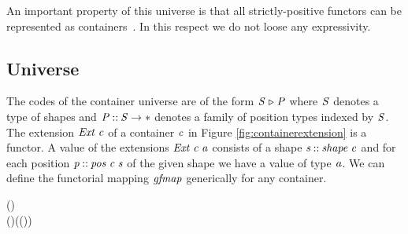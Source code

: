 An important property of this universe is that all strictly-positive
functors can be represented as containers~\cite{containers}. In this
respect we do not loose any expressivity.

\subsection{Universe}

The codes of the container universe are of the form \ensuremath{\Conid{S}{\;\triangleright\;}\Conid{P}} where
\ensuremath{\Conid{S}} denotes a type of shapes and \ensuremath{\Conid{P}\mathbin{::}\Conid{S}\to \mathbin{*}} denotes a family of
position types indexed by \ensuremath{\Conid{S}}. The extension \ensuremath{\Conid{Ext}\;\Varid{c}} of a container
\ensuremath{\Varid{c}} in Figure \ref{fig:containerextension} is a functor. A value of
the extensions \ensuremath{\Conid{Ext}\;\Varid{c}\;\Varid{a}} consists of a shape \ensuremath{\Varid{s}\mathbin{::}\Varid{shape}\;\Varid{c}} and for
each position \ensuremath{\Varid{p}\mathbin{::}\Varid{pos}\;\Varid{c}\;\Varid{s}} of the given shape we have a value of
type \ensuremath{\Varid{a}}. We can define the functorial mapping \ensuremath{\Varid{gfmap}} generically for
any container.
\begin{hscode}\SaveRestoreHook
{}%
%
%
\>[3]{}\mathbin{::}(\to {})\to {}\;\;\to {}\;\;\<[E]%
\\
\>[3]{}\;\;(\;\;)\mathrel{=}\;\;(\lambda {}\to {}\;(\;)){}\<[E]%
\ColumnHook
\end{hscode}\resethooks
